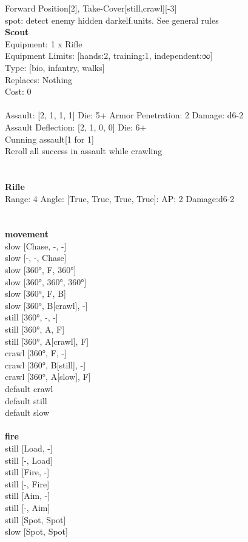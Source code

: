 \noindent Forward Position[2], Take-Cover[still,crawl][-3]\\ 
spot: detect enemy hidden darkelf.units. See general rules\\ 


{\bf Scout } \\
Equipment: 1 x Rifle \\
Equipment Limits: [hands:2, training:1, independent:∞] \\
Type: [bio, infantry, walks] \\
Replaces: Nothing \\
Cost: 0\\
\ \\
Assault: [2, 1, 1, 1] Die: 5+ Armor Penetration: 2 Damage: d6-2 \\
Assault Deflection: [2, 1, 0, 0] Die: 6+\\
\indent Cunning assault[1 for 1]\\ 
Reroll all success in assault while crawling\\ 
 
\ \\

\ \\
{\bf Rifle } \\



Range: 4  Angle: [True, True, True, True]: AP: 2 Damage:d6-2 \\




 
\ \\



\ \\ {\bf movement } \\
slow [Chase, -, -] \\
slow [-, -, Chase] \\
slow [360°, F, 360°] \\
slow [360°, 360°, 360°] \\
slow [360°, F, B] \\
slow [360°, B[crawl], -] \\
still [360°, -, -] \\
still [360°, A, F] \\
still [360°, A[crawl], F] \\
crawl [360°, F, -] \\
crawl [360°, B[still], -] \\
crawl [360°, A[slow], F] \\
default crawl \\
default still \\
default slow \\
\ \\ {\bf fire } \\
still [Load, -] \\
still [-, Load] \\
still [Fire, -] \\
still [-, Fire] \\
still [Aim, -] \\
still [-, Aim] \\
still [Spot, Spot] \\
slow [Spot, Spot] \\


